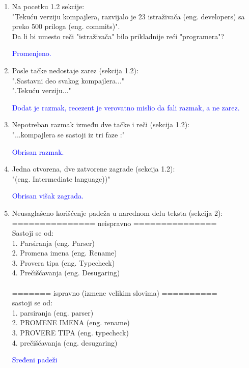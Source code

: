 \documentclass[a4paper]{report}
\newcommand{\odgovor}[1]{\textcolor{blue}{#1}}
\begin{document}
\begin{enumerate}
	\item Na pocetku 1.2 sekcije:\\
	"Tekuću verziju kompajlera, razvijalo je 23 istraživača (eng.
	developers) sa preko 500 priloga (eng. commits)". \\
	Da li bi umesto reči "istraživača" bilo prikladnije reći "programera"?
	
	\odgovor{Promenjeno.}
	
	\item Posle tačke nedostaje zarez (sekcija 1.2):\\
	".Sastavni deo svakog kompajlera..."\\
	".Tekuću verziju..."
	
	\odgovor{Dodat je razmak, recezent je verovatno mislio da fali razmak, a ne zarez.}
	
	\item Nepotreban razmak između dve tačke i reči (sekcija 1.2):\\
	"...kompajlera se sastoji iz tri faze :"
	
	\odgovor{Obrisan razmak.}
	
	\item Jedna otvorena, dve zatvorene zagrade (sekcija 1.2):\\
	"(eng. Intermediate language))"
	
	\odgovor{Obrisan višak zagrada.}
	
	\item Neusaglašeno korišćenje padeža u narednom delu teksta (sekcija 2):\\
	=============== neispravno ===============\\
	Sastoji se od:\\
	1. Parsiranja (eng. Parser)\\
	2. Promena imena (eng. Rename)\\
	3. Provera tipa (eng. Typecheck)\\
	4. Prečišćavanja (eng. Desugaring)\\\\
	======= ispravno (izmene velikim slovima) ==========\\
	sastoji se od:\\	
	1. parsiranja (eng. parser)\\	
	2. PROMENE IMENA (eng. rename)\\	
	3. PROVERE TIPA (eng. typecheck)\\
	4. prečišćavanja (eng. desugaring)
	
	\odgovor{Sređeni padeži}
	

\end{enumerate}
\end{document}
